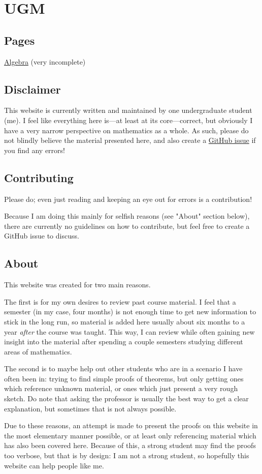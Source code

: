 \documentclass{scrartcl}
\begin{document}
\section{UGM}

\subsection{Pages}

\href{algebra.html}{Algebra} (very incomplete)

\subsection{Disclaimer}

This website is currently written and maintained by one undergraduate student (me).
I feel like everything here is---at least at its core---correct, but obviously I have a very narrow perspective on
mathematics as a whole.
As such, please do not blindly believe the material presented here, and also create a
\href{https://github.com/xtevenx/ugm/issues}{GitHub issue} if you find any errors!

\subsection{Contributing}

Please do; even just reading and keeping an eye out for errors is a contribution!

Because I am doing this mainly for selfish reasons (see "About" section below), there are currently no guidelines on
how to contribute, but feel free to create a GitHub issue to discuss.

\subsection{About}

This website was created for two main reasons.

The first is for my own desires to review past course material.
I feel that a semester (in my case, four months) is not enough time to get new information to stick in the long run, so
material is added here usually about six months to a year \textit{after} the course was taught.
This way, I can review while often gaining new insight into the material after spending a couple semesters studying
different areas of mathematics.

The second is to maybe help out other students who are in a scenario I have often been in: trying to find simple proofs
of theorems, but only getting ones which reference unknown material, or ones which just present a very rough sketch.
Do note that asking the professor is usually the best way to get a clear explanation, but sometimes that is not always
possible.

Due to these reasons, an attempt is made to present the proofs on this website in the most elementary manner possible,
or at least only referencing material which has also been covered here.
Because of this, a strong student may find the proofs too verbose, but that is by design: I am not a strong student, so
hopefully this website can help people like me.
\end{document}
